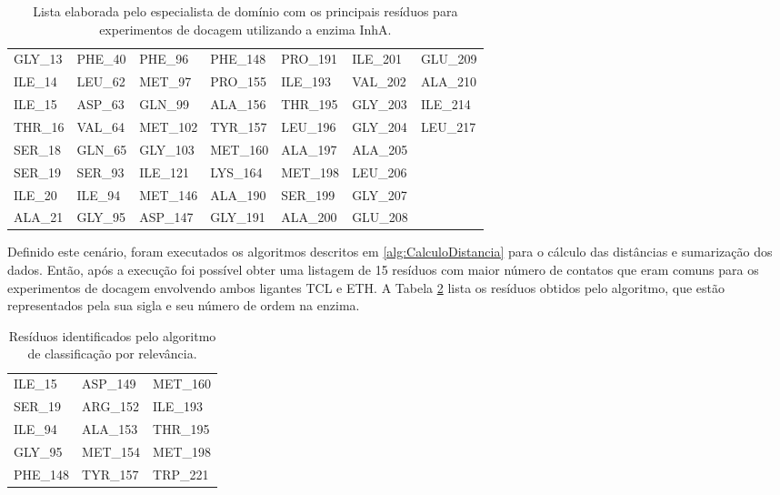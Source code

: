 \begin{table}[h]
\caption{Lista elaborada pelo especialista de domínio com os principais resíduos para experimentos de docagem utilizando a enzima InhA.}
\label{tab:listaOsmar}
\centering
\begin{tabular}{@{}lllllll@{}}
GLY\_13	&	PHE\_40 &	PHE\_96	&	PHE\_148 &	PRO\_191 &	ILE\_201 &	GLU\_209 		\\
ILE\_14	&	LEU\_62 &	MET\_97	&	PRO\_155 &	ILE\_193 &	VAL\_202 &	ALA\_210 		\\
ILE\_15	&	ASP\_63 &	GLN\_99	&	ALA\_156 &	THR\_195 &	GLY\_203 &	ILE\_214 		\\
THR\_16	&	VAL\_64 &	MET\_102 &	TYR\_157 &	LEU\_196 &	GLY\_204 &	LEU\_217 		\\
SER\_18	&	GLN\_65 &	GLY\_103 &	MET\_160 &	ALA\_197 &	ALA\_205 &					\\
SER\_19	&	SER\_93 &	ILE\_121 &	LYS\_164 &	MET\_198 &	LEU\_206 &					\\
ILE\_20	&	ILE\_94	&	MET\_146 &	ALA\_190 &	SER\_199 &	GLY\_207 &					\\
ALA\_21 &	GLY\_95	&	ASP\_147 &	GLY\_191 &	ALA\_200 &	GLU\_208 &					\\ 
\end{tabular}
\end{table}

Definido este cenário, foram executados os algoritmos descritos em \ref{alg:CalculoDistancia} para o cálculo das distâncias e sumarização dos dados. Então, após a execução foi possível obter uma listagem de 15 resíduos com maior número de contatos que eram comuns para os experimentos de docagem envolvendo ambos ligantes TCL e ETH. A Tabela \ref{tab:listaProvavelRelevantes} lista os resíduos obtidos pelo algoritmo, que estão representados pela sua sigla e seu número de ordem na enzima.

\begin{table}[h]
\caption{Resíduos identificados pelo algoritmo de classificação por relevância.}
\label{tab:listaProvavelRelevantes}
\centering
\begin{tabular}{@{}lll@{}}
ILE\_15  & ASP\_149 & MET\_160 \\
SER\_19  & ARG\_152 & ILE\_193 \\
ILE\_94  & ALA\_153 & THR\_195 \\
GLY\_95  & MET\_154 & MET\_198 \\
PHE\_148 & TYR\_157 & TRP\_221 \\
\end{tabular}
\end{table}

